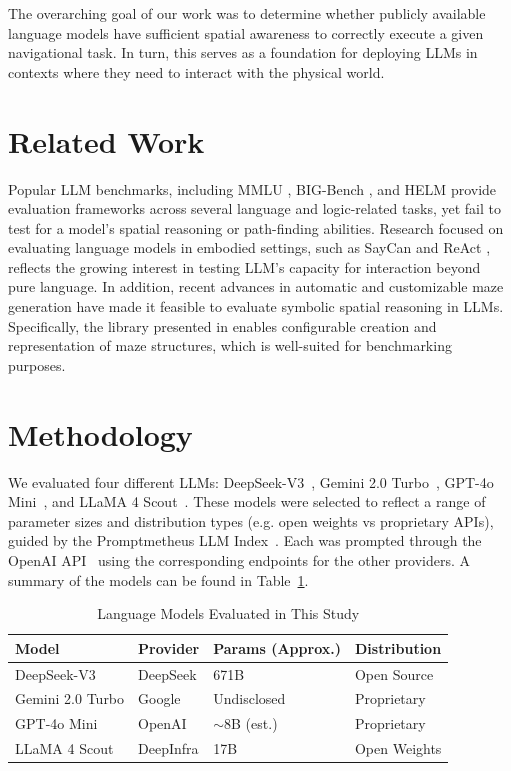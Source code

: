 \documentclass[conference]{IEEEtran}
\begin{document}
The overarching goal of our work was to determine whether publicly available language models have sufficient spatial awareness to correctly execute a given navigational task. In turn, this serves as a foundation for deploying LLMs in contexts where they need to interact with the physical world.

\section{Related Work}
Popular LLM benchmarks, including MMLU \cite{hendrycks}, BIG-Bench \cite{srivastava}, and HELM \cite{liang} provide evaluation frameworks across several language and logic-related tasks, yet fail to test for a model's spatial reasoning or path-finding abilities. Research focused on evaluating language models in embodied settings, such as SayCan \cite{ahn} and ReAct \cite{yao}, reflects the growing interest in testing LLM's capacity for interaction beyond pure language. In addition, recent advances in automatic and customizable maze generation have made it feasible to evaluate symbolic spatial reasoning in LLMs. Specifically, the library presented in \cite{ivanitskiy} enables configurable creation and representation of maze structures, which is well-suited for benchmarking purposes.

\section{Methodology}
We evaluated four different LLMs: DeepSeek-V3~\cite{deepseek}, Gemini 2.0 Turbo~\cite{gemini}, GPT-4o Mini~\cite{gpt4omini}, and LLaMA 4 Scout~\cite{llama4scout}. These models were selected to reflect a range of parameter sizes and distribution types (e.g. open weights vs proprietary APIs), guided by the Promptmetheus LLM Index~\cite{promptmetheus}. Each was prompted through the OpenAI API~\cite{openaiapi} using the corresponding endpoints for the other providers. A summary of the models can be found in Table~\ref{tab:models}.

\begin{table}[t]
  \centering
  \caption{Language Models Evaluated in This Study}
  \begin{tabular}{|l|l|l|l|}
    \hline
    \textbf{Model} & \textbf{Provider} & \textbf{Params (Approx.)} & \textbf{Distribution} \\
    \hline
    DeepSeek-V3 & DeepSeek & 671B & Open Source \\
    Gemini 2.0 Turbo& Google & Undisclosed & Proprietary \\
    GPT-4o Mini & OpenAI & $\sim$8B (est.) & Proprietary \\
    LLaMA 4 Scout & DeepInfra & 17B & Open Weights \\
    \hline
  \end{tabular}
  \label{tab:models}
\end{table}
\end{document}
